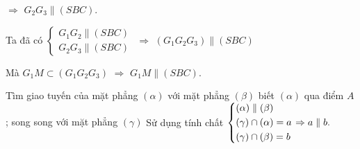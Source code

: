 \begin{vd}
{		$\Rightarrow$ $G_2G_3 \parallel (SBC)$.
		
		Ta đã có $\begin{cases} G_1G_2 \parallel (SBC) \\ G_2G_3 \parallel (SBC) \end{cases}$ $\Rightarrow$ $(G_1G_2G_3) \parallel (SBC)$ 
		
		Mà $G_1M \subset (G_1G_2G_3)$ $\Rightarrow$ $G_1M \parallel (SBC)$.
	}
\end{vd}

\begin{dang}{Tìm giao tuyến của mặt phẳng $(\alpha)$ với mặt phẳng $(\beta)$ biết $(\alpha)$ qua điểm $A$; song song với mặt phẳng $(\gamma)$ }
	Sử dụng tính chất
	$\left\{\begin{aligned}&(\alpha)\parallel(\beta)\\ &(\gamma)\cap (\alpha)=a\\ &(\gamma)\cap (\beta)=b\end{aligned}\right.\Rightarrow a\parallel b.$
\end{dang}
